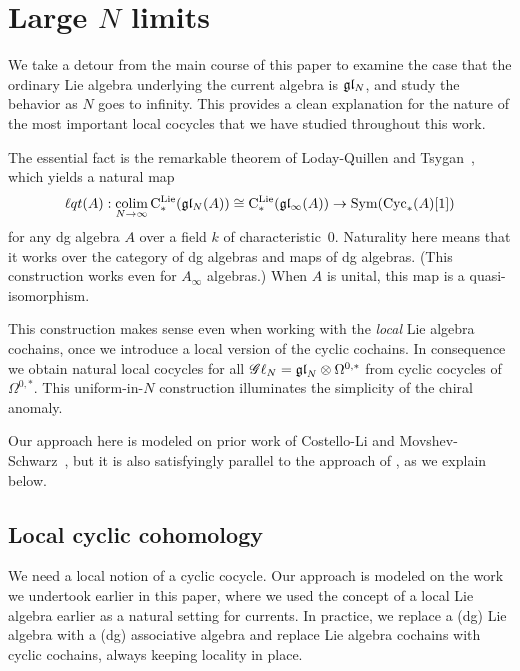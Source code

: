 \section{Large $N$ limits} \label{sec: largeN}


\def\cycls{{\rm Cyc}_*}
\def\lqt{{\ell q t}}
\def\colim{{\rm colim}}
\def\sl{\mathfrak{sl}}

We take a detour from the main course of this paper to examine the case that the ordinary Lie algebra underlying the current algebra is $\mathfrak{g} \mathfrak{l}_N$, and study the behavior as $N$ goes to infinity.
This provides a clean explanation for the nature of the most important local cocycles that we have studied throughout this work.

The essential fact is the remarkable theorem of Loday-Quillen \cite{LQ} and Tsygan~\cite{Tsy},
which yields a natural map
\[
\lqt(A) : \underset{N \to \infty}{\colim} \, \cliels(\gl_N(A)) \cong \cliels(\gl_\infty(A)) \to \Sym(\cycls(A)[1])
\]
for any dg algebra $A$ over a field $k$ of characteristic~0.
Naturality here means that it works over the category of dg algebras and maps of dg algebras.
(This construction works even for $A_\infty$ algebras.)
When $A$ is unital, this map is a quasi-isomorphism.

This construction makes sense even when working with the {\em local} Lie algebra cochains,
once we introduce a local version of the cyclic cochains.
In consequence we obtain natural local cocycles for all $\mathscr G \ell_{N} = {\mathfrak{gl}}_N \otimes \Omega^{0,*}$
from cyclic cocycles of $\Omega^{0,*}$.
This uniform-in-$N$ construction illuminates the simplicity of the chiral anomaly.

Our approach here is modeled on prior work of Costello-Li \cite{CLbcov2} and Movshev-Schwarz~\cite{MovSch},
but it is also satisfyingly parallel to the approach of \cite{FHK},
as we explain below.

\subsection{Local cyclic cohomology}

We need a local notion of a cyclic cocycle. 
Our approach is modeled on the work we undertook earlier in this paper,
where we used the concept of a local Lie algebra earlier as a natural setting for currents. 
In practice, we replace a (dg) Lie algebra with a (dg) associative algebra and replace Lie algebra cochains with cyclic cochains, 
always keeping locality in place.


